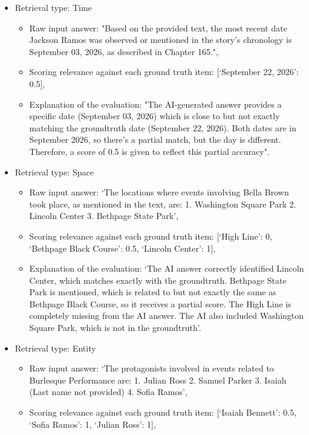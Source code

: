 \documentclass{article}
\begin{document}
\begin{itemize}
    \item Retrieval type: Time
    \begin{itemize}
        \item Raw input answer: "Based on the provided text, the most recent date Jackson Ramos was observed or mentioned in the story's chronology is September 03, 2026, as described in Chapter 165.",
        \item Scoring relevance against each ground truth item: [{`September 22, 2026': 0.5}],
        \item Explanation of the evaluation: "The AI-generated answer provides a specific date (September 03, 2026) which is close to but not exactly matching the groundtruth date (September 22, 2026). Both dates are in September 2026, so there's a partial match, but the day is different. Therefore, a score of 0.5 is given to reflect this partial accuracy".
    \end{itemize}
    \item Retrieval type: Space
    \begin{itemize}
        \item Raw input answer: `The locations where events involving Bella Brown took place, as mentioned in the text, are: 1. Washington Square Park 2. Lincoln Center 3. Bethpage State Park',
        \item Scoring relevance against each ground truth item: [{`High Line': 0}, {`Bethpage Black Course': 0.5}, {`Lincoln Center': 1}],
        \item Explanation of the evaluation: `The AI answer correctly identified Lincoln Center, which matches exactly with the groundtruth. Bethpage State Park is mentioned, which is related to but not exactly the same as Bethpage Black Course, so it receives a partial score. The High Line is completely missing from the AI answer. The AI also included Washington Square Park, which is not in the groundtruth'.
    \end{itemize}
    \item Retrieval type: Entity
    \begin{itemize}
        \item Raw input answer: `The protagonists involved in events related to Burlesque Performance are: 1. Julian Ross 2. Samuel Parker 3. Isaiah (Last name not provided) 4. Sofia Ramos',
        \item Scoring relevance against each ground truth item: [{`Isaiah Bennett': 0.5}, {`Sofia Ramos': 1}, {`Julian Ross': 1}],

\end{itemize}
\end{itemize}
\end{document}
